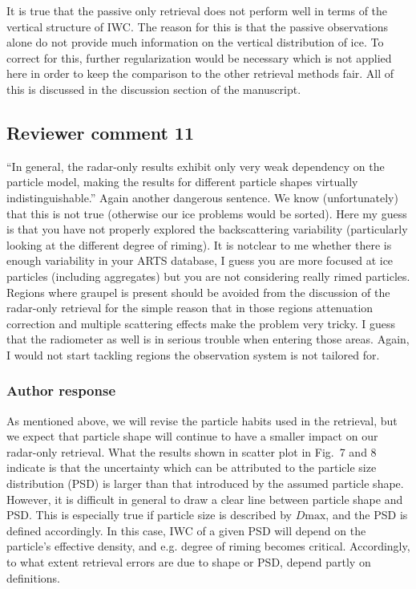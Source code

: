 It is true that the passive only retrieval does not perform well in terms of the
vertical structure of IWC. The reason for this is that the passive observations
alone do not provide much information on the vertical distribution of ice. To
correct for this, further regularization would be necessary which is not applied
here in order to keep the comparison to the other retrieval methods fair. All of
this is discussed in the discussion section of the manuscript.

\subsection*{Reviewer comment 11}

“In general, the radar-only results exhibit only very weak dependency on the
particle model, making the results for different particle shapes virtually
indistinguishable.” Again another dangerous sentence. We know (unfortunately)
that this is not true (otherwise our ice problems would be sorted). Here my guess
is that you have not properly explored the backscattering variability
(particularly looking at the different degree of riming). It is notclear to me
whether there is enough variability in your ARTS database, I guess you are more
focused at ice particles (including aggregates) but you are not considering
really rimed particles. Regions where graupel is present should be avoided from
the discussion of the radar-only retrieval for the simple reason that in those
regions attenuation correction and multiple scattering effects make the problem
very tricky. I guess that the radiometer as well is in serious trouble when
entering those areas. Again, I would not start tackling regions the observation
system is not tailored for.

\subsubsection*{Author response}

As mentioned above, we will revise the particle habits used in the retrieval,
but we expect that particle shape will continue to have a smaller impact on our
radar-only retrieval. What the results shown in scatter plot in Fig.~7 and 8
indicate is that the uncertainty which can be attributed to the particle size
distribution (PSD) is larger than that introduced by the assumed particle shape.
However, it is difficult in general to draw a clear line between particle shape
and PSD. This is especially true if particle size is described by $D\text{max}$,
and the PSD is defined accordingly. In this case, IWC of a given PSD will depend
on the particle's effective density, and e.g. degree of riming becomes critical.
Accordingly, to what extent retrieval errors are due to shape or PSD, depend
partly on definitions.

